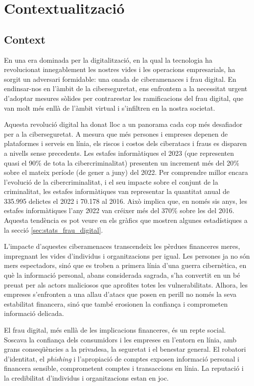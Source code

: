 \section{Contextualització} \label{sec:context}


\subsection{Context}
En una era dominada per la digitalització, en la qual la tecnologia ha revolucionat innegablement les nostres vides i les operacions empresarials, ha sorgit un adversari formidable: una onada de ciberamenaces i frau digital. En endinsar-nos en l'àmbit de la ciberseguretat, ens enfrontem a la necessitat urgent d'adoptar mesures sòlides per contrarestar les ramificacions del frau digital, que van molt més enllà de l'àmbit virtual i s'infiltren en la nostra societat.

Aquesta revolució digital ha donat lloc a un panorama cada cop més desafiador per a la ciberseguretat. A mesura que més persones i empreses depenen de plataformes i serveis en línia, els riscos i costos dels ciberatacs i fraus es disparen a nivells sense precedents. Les estafes informàtiques el 2023 (que representen quasi el 90\% de tota la cibercriminalitat) presenten un increment més del 20\% sobre el mateix període (de gener a juny) del 2022. Per comprendre millor encara l'evolució de la cibercriminalitat, i el seu impacte sobre el conjunt de la criminalitat, les estafes informàtiques van representar la quantitat anual de 335.995 delictes el 2022 i 70.178 al 2016. Això implica que, en només sis anys, les estafes informàtiques l'any 2022 van créixer més del 370\% sobre les del 2016. \cite{criminalitat} Aquesta tendència es pot veure en els gràfics que mostren algunes estadístiques a la secció \ref{sec:stats_frau_digital}.

L'impacte d'aquestes ciberamenaces transcendeix les pèrdues financeres meres, impregnant les vides d'individus i organitzacions per igual. Les persones ja no són mers espectadors, sinó que es troben a primera línia d'una guerra cibernètica, en què la informació personal, abans considerada sagrada, s'ha convertit en un bé preuat per als actors maliciosos que aprofites totes les vulnerabilitats. Alhora, les empreses s'enfronten a una allau d'atacs que posen en perill no només la seva estabilitat financera, sinó que també erosionen la confiança i comprometen informació delicada.

El frau digital, més enllà de les implicacions financeres, és un repte social. Soscava la confiança dels consumidors i les empreses en l'entorn en línia, amb grans conseqüències a la privadesa, la seguretat i el benestar general. El robatori d'identitat, el \textit{phishing} i l'apropiació de comptes exposen informació personal i financera sensible, comprometent comptes i transaccions en línia. La reputació i la credibilitat d'individus i organitzacions estan en joc.

